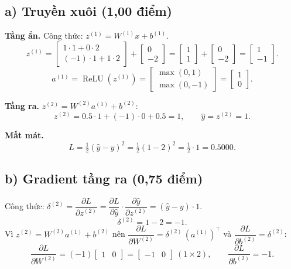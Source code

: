 \documentclass[12pt,a4paper]{article}
\newcommand{\relu}{\operatorname{ReLU}}
\newcommand{\pd}[2]{\dfrac{\partial #1}{\partial #2}}
\begin{document}
\subsection*{a) Truyền xuôi (1,00 điểm)}

\textbf{Tầng ẩn.} Công thức: $z^{(1)}=W^{(1)}x+b^{(1)}$.
\[
z^{(1)}=\begin{bmatrix}1\cdot1+0\cdot2\\(-1)\cdot1+1\cdot2\end{bmatrix}+\begin{bmatrix}0\\-2\end{bmatrix}
=\begin{bmatrix}1\\1\end{bmatrix}+\begin{bmatrix}0\\-2\end{bmatrix}
=\begin{bmatrix}1\\-1\end{bmatrix}.
\]
\[
a^{(1)}=\relu(z^{(1)})=\begin{bmatrix}\max(0,1)\\\max(0,-1)\end{bmatrix}=\begin{bmatrix}1\\0\end{bmatrix}.
\]

\textbf{Tầng ra.} $z^{(2)}=W^{(2)}a^{(1)}+b^{(2)}$:
\[
z^{(2)}=0.5\cdot1+(-1)\cdot0+0.5=1,\qquad \hat y=z^{(2)}=1.
\]

\textbf{Mất mát.}
\[
L=\tfrac12(\hat y-y)^2=\tfrac12(1-2)^2=\tfrac12\cdot1=\boxed{0.5000}.
\]

\subsection*{b) Gradient tầng ra (0,75 điểm)}

Công thức: $\delta^{(2)}=\pd{L}{z^{(2)}}=\pd{L}{\hat y}\cdot\pd{\hat y}{z^{(2)}}=(\hat y-y)\cdot1$.
\[
\delta^{(2)}=1-2=\boxed{-1}.
\]
Vì $z^{(2)}=W^{(2)}a^{(1)}+b^{(2)}$ nên $\pd{L}{W^{(2)}}=\delta^{(2)}\,(a^{(1)})^{\top}$ và $\pd{L}{b^{(2)}}=\delta^{(2)}$:
\[
\pd{L}{W^{(2)}}=(-1)\begin{bmatrix}1&0\end{bmatrix}=\boxed{\begin{bmatrix}-1&0\end{bmatrix}}\ (1\times2),\qquad
\pd{L}{b^{(2)}}=\boxed{-1}.
\]
\end{document}

